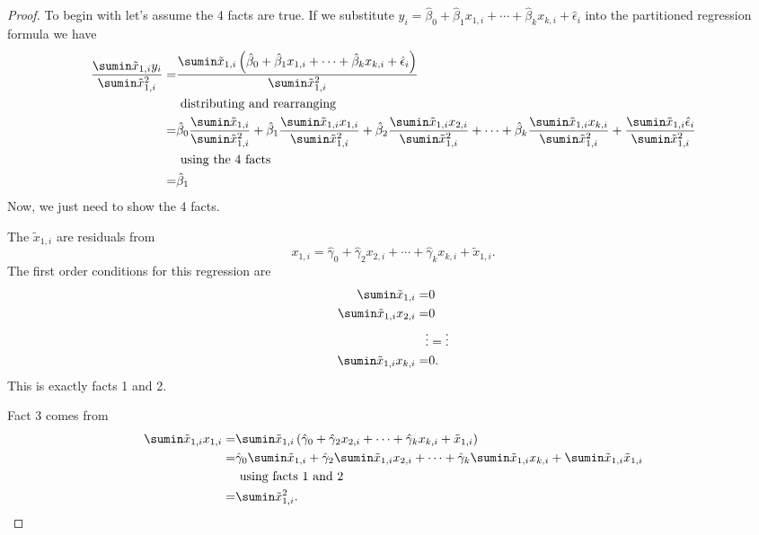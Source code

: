 \begin{proof}
  To begin with let's assume the 4 facts are true. If we substitute
  $y_i = \hat{\beta}_0 + \hat{\beta}_1 x_{1,i} + \cdots +
  \hat{\beta}_k x_{k,i} + \hat{\epsilon}_i$ into the partitioned
  regression formula we have
  \begin{align*}
    \frac{\sumin \tilde{x}_{1,i} y_i } { \sumin \tilde{x}_{1,i}^2} 
    = &
        \frac{\sumin \tilde{x}_{1,i} \left( \hat{\beta}_0 + \hat{\beta}_1 x_{1,i} + \cdots +
        \hat{\beta}_k x_{k,i} + \hat{\epsilon}_i \right) } { \sumin
        \tilde{x}_{1,i}^2} \\
    & \text{ distributing and rearranging} \\
    = & 
        \hat{\beta}_0 \frac{\sumin \tilde{x}_{1,i}} { \sumin
        \tilde{x}_{1,i}^2} + \hat{\beta}_1 \frac{\sumin
        \tilde{x}_{1,i} x_{1,i}} { \sumin
        \tilde{x}_{1,i}^2} + \hat{\beta}_2 \frac{\sumin
        \tilde{x}_{1,i} x_{2,i}} { \sumin
        \tilde{x}_{1,i}^2}  + \cdots + \hat{\beta}_k \frac{\sumin
        \tilde{x}_{1,i} x_{k,i}} { \sumin
        \tilde{x}_{1,i}^2} + \frac{\sumin
        \tilde{x}_{1,i} \hat{\epsilon}_i} { \sumin
        \tilde{x}_{1,i}^2} \\
    & \text{ using the 4 facts } \\
    = & \hat{\beta}_1
  \end{align*}
  Now, we just need to show the 4 facts. 

  The $\tilde{x}_{1,i}$ are residuals from 
  \[ x_{1,i} = \hat{\gamma}_0 + \hat{\gamma}_2 x_{2,i} + \cdots +
  \hat{\gamma}_k x_{k,i} + \tilde{x}_{1,i}. \]
  The first order conditions for this regression are
  \begin{align*}
    \sumin \tilde{x}_{1,i} = & 0 \\
    \sumin \tilde{x}_{1,i} x_{2,i} = & 0 \\
    \vdots & = \vdots \\
    \sumin \tilde{x}_{1,i} x_{k,i} = & 0.
  \end{align*}
  This is exactly facts 1 and 2. 

  Fact 3 comes from
  \begin{align*}
    \sumin \tilde{x}_{1,i} x_{1,i} 
    = & \sumin \tilde{x}_{1,i} \left(\hat{\gamma}_0 + \hat{\gamma}_2 x_{2,i} + \cdots +
  \hat{\gamma}_k x_{k,i} + \tilde{x}_{1,i} \right) \\
    =  &\hat{\gamma}_0 \sumin\tilde{x}_{1,i} + \hat{\gamma}_2
         \sumin\tilde{x}_{1,i} x_{2,i} + \cdots + \hat{\gamma}_k
         \sumin\tilde{x}_{1,i} x_{k,i} + 
         \sumin\tilde{x}_{1,i} \tilde{x}_{1,i} \\
    & \text{ using facts 1 and 2} \\
    = &  \sumin\tilde{x}_{1,i}^2.
  \end{align*}
  

\end{proof}

